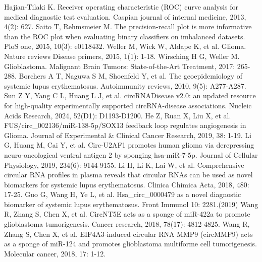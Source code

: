 \documentclass{bioinfo}
\begin{document}
\begin{thebibliography}{}
Hajian-Tilaki K. Receiver operating characteristic (ROC) curve analysis for medical diagnostic test evaluation. Caspian journal of internal medicine, 2013, 4(2): 627.
Saito T, Rehmsmeier M. The precision-recall plot is more informative than the ROC plot when evaluating binary classifiers on imbalanced datasets. PloS one, 2015, 10(3): e0118432.
%
Weller M, Wick W, Aldape K, et al. Glioma. Nature reviews Disease primers, 2015, 1(1): 1-18.
%
Wirsching H G, Weller M. Glioblastoma. Malignant Brain Tumors: State-of-the-Art Treatment, 2017: 265-288.
%
Borchers A T, Naguwa S M, Shoenfeld Y, et al. The geoepidemiology of systemic lupus erythematosus. Autoimmunity reviews, 2010, 9(5): A277-A287.
Sun Z Y, Yang C L, Huang L J, et al. circRNADisease v2.0: an updated resource for high-quality experimentally supported circRNA-disease associations. Nucleic Acids Research, 2024, 52(D1): D1193-D1200.
%
He Z, Ruan X, Liu X, et al. FUS/circ\_002136/miR-138-5p/SOX13 feedback loop regulates angiogenesis in Glioma. Journal of Experimental \& Clinical Cancer Research, 2019, 38: 1-19.
Li G, Huang M, Cai Y, et al. Circ‐U2AF1 promotes human glioma via derepressing neuro‐oncological ventral antigen 2 by sponging hsa‐miR‐7‐5p. Journal of Cellular Physiology, 2019, 234(6): 9144-9155.
Li H, Li K, Lai W, et al. Comprehensive circular RNA profiles in plasma reveals that circular RNAs can be used as novel biomarkers for systemic lupus erythematosus. Clinica Chimica Acta, 2018, 480: 17-25.
Guo G, Wang H, Ye L, et al. Hsa\_circ\_0000479 as a novel diagnostic biomarker of systemic lupus erythematosus. Front Immunol 10: 2281.(2019)
Wang R, Zhang S, Chen X, et al. CircNT5E acts as a sponge of miR-422a to promote glioblastoma tumorigenesis. Cancer research, 2018, 78(17): 4812-4825.
Wang R, Zhang S, Chen X, et al. EIF4A3-induced circular RNA MMP9 (circMMP9) acts as a sponge of miR-124 and promotes glioblastoma multiforme cell tumorigenesis. Molecular cancer, 2018, 17: 1-12.
\end{thebibliography}
\end{document}

